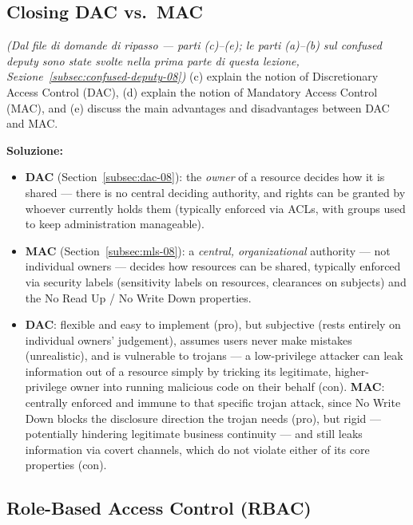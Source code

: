 \documentclass[12pt, a4paper]{article}
\newcounter{esercizio}[section]
\begin{document}
\subsection{Closing DAC vs.\ MAC}

\begin{tcolorbox}[colback=lightergray!10, colframe=tocsec, title=\textbf{Esercizio \theesercizio}]
\textit{(Dal file di domande di ripasso --- parti (c)--(e); le parti (a)--(b) sul confused deputy sono state svolte nella prima parte di questa lezione, Sezione~\ref{subsec:confused-deputy-08})} (c) explain the notion of Discretionary Access Control (DAC), (d) explain the notion of Mandatory Access Control (MAC), and (e) discuss the main advantages and disadvantages between DAC and MAC.
\end{tcolorbox}

\textbf{Soluzione:}
\begin{itemize}
    \item[(c)] \textbf{DAC} (Section~\ref{subsec:dac-08}): the \emph{owner} of a resource decides how it is shared --- there is no central deciding authority, and rights can be granted by whoever currently holds them (typically enforced via ACLs, with groups used to keep administration manageable).
    \item[(d)] \textbf{MAC} (Section~\ref{subsec:mls-08}): a \emph{central, organizational} authority --- not individual owners --- decides how resources can be shared, typically enforced via security labels (sensitivity labels on resources, clearances on subjects) and the No Read Up / No Write Down properties.
    \item[(e)] \textbf{DAC}: flexible and easy to implement (pro), but subjective (rests entirely on individual owners' judgement), assumes users never make mistakes (unrealistic), and is vulnerable to trojans --- a low-privilege attacker can leak information out of a resource simply by tricking its legitimate, higher-privilege owner into running malicious code on their behalf (con). \textbf{MAC}: centrally enforced and immune to that specific trojan attack, since No Write Down blocks the disclosure direction the trojan needs (pro), but rigid --- potentially hindering legitimate business continuity --- and still leaks information via covert channels, which do not violate either of its core properties (con).
\end{itemize}

\subsection{Role-Based Access Control (RBAC)}
\label{subsec:rbac-08}
\end{document}
